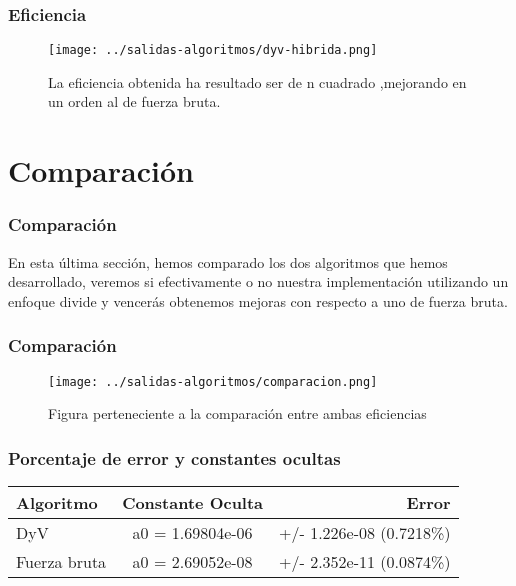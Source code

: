 \documentclass{beamer}
\begin{document}
\begin{frame}
	\frametitle{Eficiencia}
		
			\begin{figure}[H]
				\centering
				\texttt{[image: ../salidas-algoritmos/dyv-hibrida.png]}
				\caption{	La eficiencia obtenida ha resultado ser de n cuadrado ,mejorando en un orden al de fuerza bruta.}
				\label{fig:fuerzabruta-hibrida}
			\end{figure}
\end{frame}

\section{Comparación} %
\begin{frame}
	\frametitle{Comparación}
	En esta última sección, hemos comparado los dos algoritmos que hemos desarrollado, veremos si efectivamente o no nuestra implementación utilizando un enfoque divide y vencerás obtenemos mejoras con respecto a uno de fuerza bruta.
	
\end{frame}

\begin{frame}
	\frametitle{Comparación}
	\begin{figure}[H]
		\centering
		\texttt{[image: ../salidas-algoritmos/comparacion.png]}
		\caption{Figura perteneciente a la comparación entre ambas eficiencias}
		\label{fig:fuerzabruta-hibrida}
	\end{figure}
	
\end{frame}

\begin{frame}
	\frametitle{Porcentaje de error y constantes ocultas}

\begin{center}
	\begin{tabular}{| l | c | r |}
		\hline
		\textbf{Algoritmo} & \textbf{Constante Oculta} & \textbf{Error} \\ \hline
		DyV & a0 = 1.69804e-06  & +/- 1.226e-08    (0.7218\%)\\ 
		\hline
		Fuerza bruta & a0 = 2.69052e-08 & +/- 2.352e-11    (0.0874\%)
		
	\end{tabular}
\end{center}
\end{frame}
\end{document}
